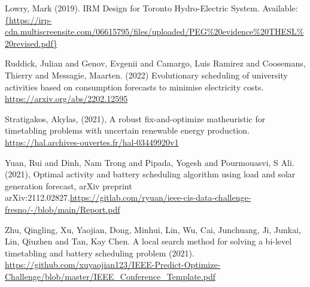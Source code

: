 \documentclass[conference]{IEEEtran}
\begin{document}
\begin{thebibliography}{00}
 Lowry, Mark (2019). IRM Design for Toronto Hydro-Electric System. Available: \url{{https://irp-cdn.multiscreensite.com/06615795/files/uploaded/PEG%20evidence%20THESL%20revised.pdf}}

 Ruddick, Julian and Genov, Evgenii and Camargo, Luis Ramirez and Coosemans, Thierry and Messagie, 
Maarten. (2022) Evolutionary scheduling of university activities based on consumption forecasts to minimise electricity costs.  \url{https://arxiv.org/abs/2202.12595}

  
 Stratigakos, Akylas, (2021),  A robust fix-and-optimize matheuristic for timetabling problems with uncertain renewable energy production. \url{https://hal.archives-ouvertes.fr/hal-03449920v1}

 Yuan, Rui and Dinh, Nam Trong and Pipada, Yogesh and Pourmouasvi, S Ali.   (2021), 
  Optimal activity and battery scheduling algorithm using load and solar generation forecast, arXiv preprint arXiv:2112.02827.\url{https://gitlab.com/ryuan/ieee-cis-data-challenge-fresno/-/blob/main/Report.pdf}

Zhu, Qingling,  Xu, Yaojian, Dong, Minhui, Lin, Wu,  Cai, Junchuang,  Ji, Junkai,  Lin, Qiuzhen  and Tan, Kay Chen. A local search method for solving a bi-level timetabling and battery scheduling problem (2021). \url{https://github.com/xuyaojian123/IEEE-Predict-Optimize-Challenge/blob/master/IEEE_Conference_Template.pdf}

\end{thebibliography}
\end{document}
